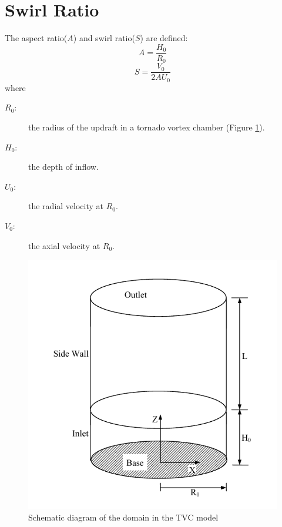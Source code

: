 \documentclass{article}
\begin{document}
\section{Swirl Ratio}
The aspect ratio($A$) and swirl ratio($S$) are defined\cite{Natarajan-17}:
$$ A = \frac{H_0}{R_0} $$
$$ S = \frac{V_0}{2 A U_0} $$
where
\begin{description}
	\item[$R_0$: ] the radius of the updraft  in a tornado vortex chamber (Figure \ref{fig:TVC-diagram}).
	\item[$H_0$: ] the depth of inflow.
	\item[$U_0$: ] the radial velocity at $R_0$.
	\item[$V_0$: ] the axial velocity at $R_0$.
\end{description}

\begin{figure}
\centering
\includegraphics{_figure/TVC-diagram.pdf}
\caption[Schematic diagram of TVC]{Schematic diagram of the domain in the TVC model}
\label{fig:TVC-diagram}
\end{figure}




\end{document}
